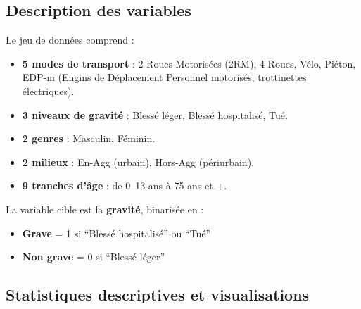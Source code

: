 \documentclass[12pt,a4paper]{article}
\begin{document}
\subsection{Description des variables}

Le jeu de données comprend :
\begin{itemize}
  \item \textbf{5 modes de transport} : 2 Roues Motorisées (2RM),
        4 Roues, Vélo, Piéton, EDP-m (Engins de Déplacement Personnel
        motorisés, trottinettes électriques).
  \item \textbf{3 niveaux de gravité} : Blessé léger, Blessé hospitalisé,
        Tué.
  \item \textbf{2 genres} : Masculin, Féminin.
  \item \textbf{2 milieux} : En-Agg (urbain), Hors-Agg (périurbain).
  \item \textbf{9 tranches d'âge} : de 0--13 ans à 75 ans et +.
\end{itemize}

La variable cible est la \textbf{gravité}, binarisée en :
\begin{itemize}
  \item \textbf{Grave} = 1 si ``Blessé hospitalisé'' ou ``Tué''
  \item \textbf{Non grave} = 0 si ``Blessé léger''
\end{itemize}

\subsection{Statistiques descriptives et visualisations}
\end{document}
